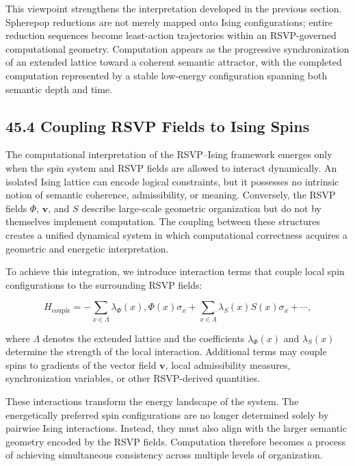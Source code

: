 \documentclass[12pt,letterpaper]{article}
\theoremstyle{remark}
\begin{document}
This viewpoint strengthens the interpretation developed in the previous section. Spherepop reductions are not merely mapped onto Ising configurations; entire reduction sequences become least-action trajectories within an RSVP-governed computational geometry. Computation appears as the progressive synchronization of an extended lattice toward a coherent semantic attractor, with the completed computation represented by a stable low-energy configuration spanning both semantic depth and time.

\subsection{45.4 Coupling RSVP Fields to Ising Spins}

The computational interpretation of the RSVP--Ising framework emerges only when the spin system and RSVP fields are allowed to interact dynamically. An isolated Ising lattice can encode logical constraints, but it possesses no intrinsic notion of semantic coherence, admissibility, or meaning. Conversely, the RSVP fields $\Phi$, $\mathbf{v}$, and $S$ describe large-scale geometric organization but do not by themselves implement computation. The coupling between these structures creates a unified dynamical system in which computational correctness acquires a geometric and energetic interpretation.

To achieve this integration, we introduce interaction terms that couple local spin configurations to the surrounding RSVP fields:

\[
H_{\text{couple}} = -
\sum_{x\in\Lambda}
\lambda_\Phi(x),
\Phi(x)\sigma_x
+
\sum_{x\in\Lambda}
\lambda_S(x)
S(x)\sigma_x
+
\cdots,
\]

where $\Lambda$ denotes the extended lattice and the coefficients $\lambda_\Phi(x)$ and $\lambda_S(x)$ determine the strength of the local interaction. Additional terms may couple spins to gradients of the vector field $\mathbf{v}$, local admissibility measures, synchronization variables, or other RSVP-derived quantities.

These interactions transform the energy landscape of the system. The energetically preferred spin configurations are no longer determined solely by pairwise Ising interactions. Instead, they must also align with the larger semantic geometry encoded by the RSVP fields. Computation therefore becomes a process of achieving simultaneous consistency across multiple levels of organization.
\end{document}

